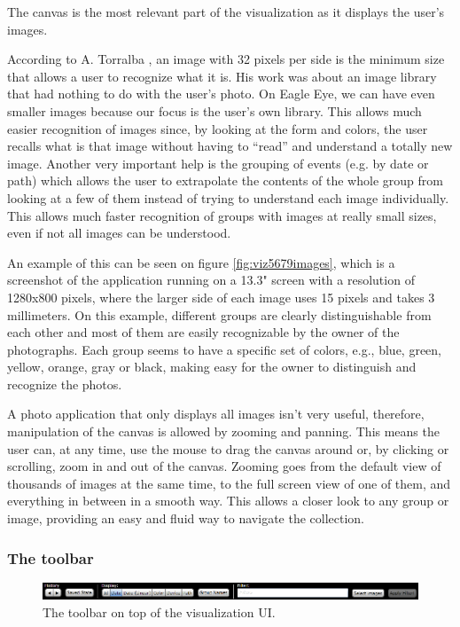 The canvas is the most relevant part of the visualization as it displays the user's images.

According to A. Torralba \cite{Torralba:2008p527}, an image with 32 pixels per side is the minimum size that allows a user to recognize what it is. His work was about an image library that had nothing to do with the user's photo. On Eagle Eye, we can have even smaller images because our focus is the user's own library. This allows much easier recognition of images since, by looking at the form and colors, the user recalls what is that image without having to ``read'' and understand a totally new image. Another very important help is the grouping of events (e.g. by date or path) which allows the user to extrapolate the contents of the whole group from looking at a few of them instead of trying to understand each image individually. This allows much faster recognition of groups with images at really small sizes, even if not all images can be understood.

An example of this can be seen on figure \ref{fig:viz5679images}, which is a screenshot of the application running on a 13.3" screen with a resolution of 1280x800 pixels, where the larger side of each image uses 15 pixels and takes 3 millimeters. On this example, different groups are clearly distinguishable from each other and most of them are easily recognizable by the owner of the photographs. Each group seems to have a specific set of colors, e.g., blue, green, yellow, orange, gray or black, making easy for the owner to distinguish and recognize the photos.

A photo application that only displays all images isn't very useful, therefore, manipulation of the canvas is allowed by zooming and panning. This means the user can, at any time, use the mouse to drag the canvas around or, by clicking or scrolling, zoom in and out of the canvas. Zooming goes from the default view of thousands of images at the same time, to the full screen view of one of them, and everything in between in a smooth way. This allows a closer look to any group or image, providing an easy and fluid way to navigate the collection.


\subsubsection{The toolbar}

\begin{figure}[htbp]
	\centering
		\includegraphics[width=\linewidth]{Figures/toolbar.png}
	\caption{The toolbar on top of the visualization \ac{UI}.}
	\label{fig:toolbar}
\end{figure}


